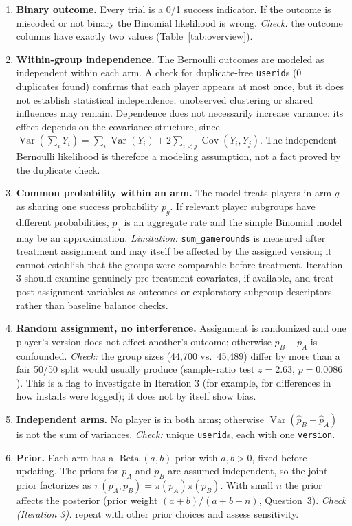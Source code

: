 \documentclass[11pt]{article}
\newcommand{\Var}{\operatorname{Var}}
\newcommand{\Beta}{\operatorname{Beta}}
\begin{document}
\begin{enumerate}[label=A\arabic*.]
\item \textbf{Binary outcome.} Every trial is a 0/1 success indicator. If the outcome is miscoded or not binary the Binomial likelihood is wrong. \emph{Check:} the outcome columns have exactly two values (Table~\ref{tab:overview}).
\item \textbf{Within-group independence.} The Bernoulli outcomes are modeled as independent within each arm. A check for duplicate-free \texttt{userid}s (0 duplicates found) confirms that each player appears at most once, but it does not establish statistical independence; unobserved clustering or shared influences may remain. Dependence does not necessarily increase variance: its effect depends on the covariance structure, since $\Var(\sum_iY_i)=\sum_i\Var(Y_i)+2\sum_{i<j}\operatorname{Cov}(Y_i,Y_j)$. The independent-Bernoulli likelihood is therefore a modeling assumption, not a fact proved by the duplicate check.
\item \textbf{Common probability within an arm.} The model treats players in arm $g$ as sharing one success probability $p_g$. If relevant player subgroups have different probabilities, $p_g$ is an aggregate rate and the simple Binomial model may be an approximation. \emph{Limitation:} \texttt{sum\_gamerounds} is measured after treatment assignment and may itself be affected by the assigned version; it cannot establish that the groups were comparable before treatment. Iteration 3 should examine genuinely pre-treatment covariates, if available, and treat post-assignment variables as outcomes or exploratory subgroup descriptors rather than baseline balance checks.
\item \textbf{Random assignment, no interference.} Assignment is randomized and one player's version does not affect another's outcome; otherwise $p_B-p_A$ is confounded. \emph{Check:} the group sizes (44{,}700 vs.\ 45{,}489) differ by more than a fair 50/50 split would usually produce (sample-ratio test $z=2.63$, $p=0.0086$). This is a flag to investigate in Iteration 3 (for example, for differences in how installs were logged); it does not by itself show bias.
\item \textbf{Independent arms.} No player is in both arms; otherwise $\Var(\hat p_B-\hat p_A)$ is not the sum of variances. \emph{Check:} unique \texttt{userid}s, each with one \texttt{version}.
\item \textbf{Prior.} Each arm has a $\Beta(a,b)$ prior with $a,b>0$, fixed before updating. The priors for $p_A$ and $p_B$ are assumed independent, so the joint prior factorizes as $\pi(p_A,p_B)=\pi(p_A)\pi(p_B)$. With small $n$ the prior affects the posterior (prior weight $(a+b)/(a+b+n)$, Question~3). \emph{Check (Iteration 3):} repeat with other prior choices and assess sensitivity.

\end{enumerate}
\end{document}
